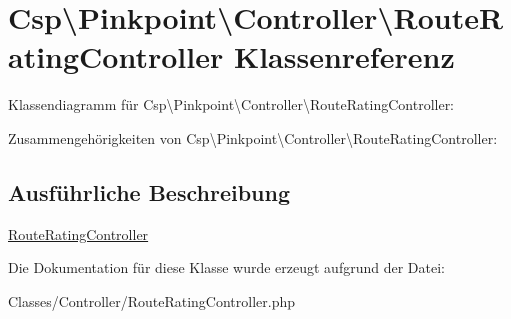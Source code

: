 \hypertarget{classCsp_1_1Pinkpoint_1_1Controller_1_1RouteRatingController}{}\section{Csp\textbackslash{}Pinkpoint\textbackslash{}Controller\textbackslash{}Route\+Rating\+Controller Klassenreferenz}
\label{classCsp_1_1Pinkpoint_1_1Controller_1_1RouteRatingController}


Klassendiagramm für Csp\textbackslash{}Pinkpoint\textbackslash{}Controller\textbackslash{}Route\+Rating\+Controller\+:


Zusammengehörigkeiten von Csp\textbackslash{}Pinkpoint\textbackslash{}Controller\textbackslash{}Route\+Rating\+Controller\+:


\subsection{Ausführliche Beschreibung}
\hyperlink{classCsp_1_1Pinkpoint_1_1Controller_1_1RouteRatingController}{Route\+Rating\+Controller} 

Die Dokumentation für diese Klasse wurde erzeugt aufgrund der Datei\+:\begin{DoxyCompactItemize}
\item 
Classes/\+Controller/Route\+Rating\+Controller.\+php\end{DoxyCompactItemize}
